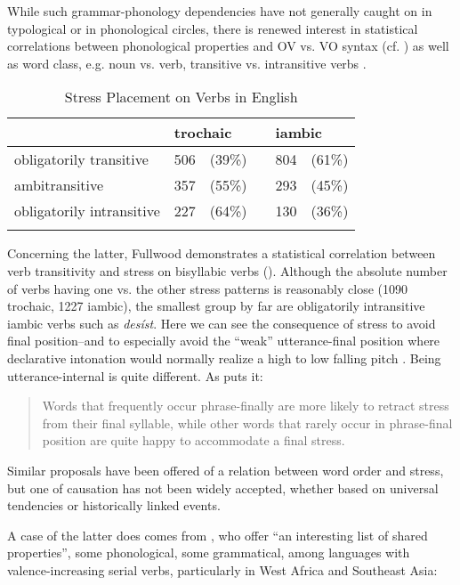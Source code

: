 \documentclass[output=paper]{langsci/langscibook}
\begin{document}
While such grammar-phonology dependencies have not generally caught on in typological or in phonological circles, there is renewed interest in statistical correlations between phonological properties and OV vs. VO syntax \citep{NesporEtAl2011,Tokizaki2010,Tokizaki2012} (cf. \citealt{Cinque1993}) as well as word class, e.g. noun vs. verb, transitive vs. intransitive verbs \citep{Smith2011,Dingemanse2015,Fullwood2014}.
\begin{table}
\begin{tabular}{llllll} 
\lsptoprule
& \multicolumn{2}{l}{ {trochaic}} &  & \multicolumn{2}{l}{ {iambic}}\\
\midrule
obligatorily transitive & 506 & (39\%) &  & 804 & (61\%)\\
ambitransitive & 357 & (55\%) &  & 293 & (45\%)\\
obligatorily intransitive & 227 & (64\%) &  & 130 & (36\%)\\
\lspbottomrule
\end{tabular}
\caption{Stress Placement on Verbs in English}
\label{tab:hyman:fulwood}
\end{table}


Concerning the latter, Fullwood  demonstrates a statistical correlation between verb transitivity and stress on  bisyllabic verbs ().  Although the absolute number of verbs having one vs. the other stress patterns is reasonably close (1090 trochaic, 1227 iambic), the smallest group by far are obligatorily intransitive iambic verbs such as \textit{desíst}. Here we can see the consequence of stress to avoid final position--and to especially avoid the “weak” utterance-final position where declarative intonation would normally realize a high to low falling pitch \citep[45]{Hyman1977}. Being utterance-internal is quite different. As \citet{Fullwood2014} puts it:

\begin{quote}
Words that frequently occur phrase-finally are more likely to retract stress from their final syllable, while other words that rarely occur in phrase-final position are quite happy to accommodate a final stress. \citep[130]{Fullwood2014}
\end{quote}


Similar proposals have been offered of a relation between word order and stress, but one of causation has not been widely accepted, whether based on universal tendencies or historically linked events.

   A case of the latter does comes from \citet[50-51]{Foley1985}, who offer “an interesting list of shared properties”, some phonological, some grammatical, among languages with valence-increasing serial verbs, particularly in West Africa and Southeast Asia:
\end{document}
